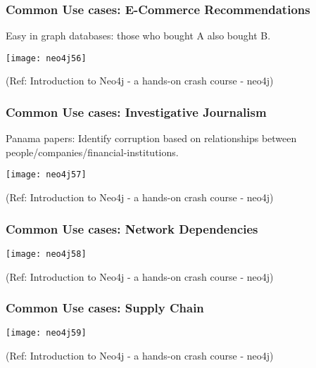 \begin{frame}\frametitle{Common Use cases: E-Commerce Recommendations}


Easy in graph databases: those who bought A also bought B.

\begin{center}
\texttt{[image: neo4j56]}
\end{center}	

{\tiny (Ref: Introduction to Neo4j - a hands-on crash course - neo4j)}
\end{frame}

\begin{frame}\frametitle{Common Use cases: Investigative Journalism}

Panama papers: Identify corruption based on relationships between people/companies/financial-institutions.

\begin{center}
\texttt{[image: neo4j57]}
\end{center}	

{\tiny (Ref: Introduction to Neo4j - a hands-on crash course - neo4j)}
\end{frame}

\begin{frame}[fragile]\frametitle{Common Use cases: Network Dependencies}



\begin{center}
\texttt{[image: neo4j58]}
\end{center}	

{\tiny (Ref: Introduction to Neo4j - a hands-on crash course - neo4j)}
\end{frame}


\begin{frame}[fragile]\frametitle{Common Use cases: Supply Chain}



\begin{center}
\texttt{[image: neo4j59]}
\end{center}	

{\tiny (Ref: Introduction to Neo4j - a hands-on crash course - neo4j)}
\end{frame}



